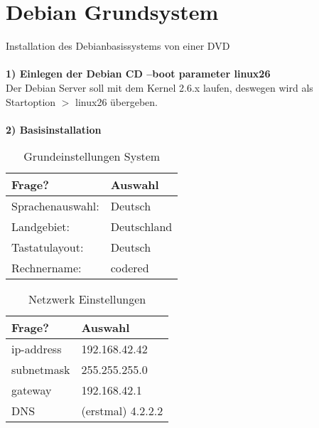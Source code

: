 \section{Debian Grundsystem}
\label{section:Debian Grundsystem}
Installation des Debianbasissystems von einer DVD \\
\\
\textbf{1) Einlegen der Debian CD --boot parameter \glqq linux26\grqq} \\
Der Debian Server soll mit dem Kernel 2.6.x laufen, deswegen wird als Startoption $>$ linux26 übergeben. \\
\\
\textbf{2) Basisinstallation}
\begin{table}[htbp]
\begin{center}
\begin{tabular*}{0.95\textwidth}{p{}p{}}
\hline
\textbf{Frage?} & \textbf{Auswahl} \\
\hline
Sprachenauswahl: & Deutsch \\
Landgebiet: & Deutschland \\
Tastatulayout: & Deutsch \\
Rechnername: & codered \\
\hline
\end{tabular*}
\caption{Grundeinstellungen System}
\label{table:Grundeinstellungen System}
\end{center}
\end{table}
\begin{table}[htbp]
\begin{center}
\begin{tabular*}{0.95\textwidth}{p{}p{}}
\hline
\textbf{Frage?} & \textbf{Auswahl} \\
\hline
ip-address & 192.168.42.42 \\
subnetmask & 255.255.255.0 \\
gateway & 192.168.42.1 \\
DNS & (erstmal) 4.2.2.2 \\
\hline
\end{tabular*}
\caption{Netzwerk Einstellungen}
\label{table:Netzwerk Einstellungen}
\end{center}
\end{table}
